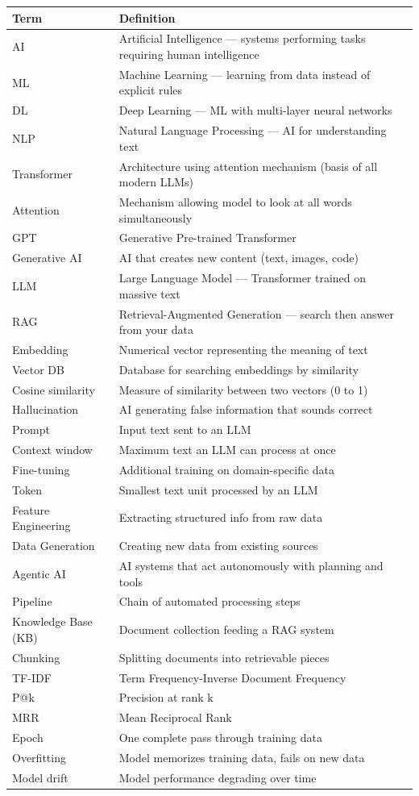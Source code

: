 \documentclass[11pt,a4paper]{report}
\begin{document}
\begin{longtable}{l p{10cm}}
\toprule
\textbf{Term} & \textbf{Definition} \\
\midrule
\endhead
AI & Artificial Intelligence --- systems performing tasks requiring human intelligence \\
ML & Machine Learning --- learning from data instead of explicit rules \\
DL & Deep Learning --- ML with multi-layer neural networks \\
NLP & Natural Language Processing --- AI for understanding text \\
Transformer & Architecture using attention mechanism (basis of all modern LLMs) \\
Attention & Mechanism allowing model to look at all words simultaneously \\
GPT & Generative Pre-trained Transformer \\
Generative AI & AI that creates new content (text, images, code) \\
LLM & Large Language Model --- Transformer trained on massive text \\
RAG & Retrieval-Augmented Generation --- search then answer from your data \\
Embedding & Numerical vector representing the meaning of text \\
Vector DB & Database for searching embeddings by similarity \\
Cosine similarity & Measure of similarity between two vectors (0 to 1) \\
Hallucination & AI generating false information that sounds correct \\
Prompt & Input text sent to an LLM \\
Context window & Maximum text an LLM can process at once \\
Fine-tuning & Additional training on domain-specific data \\
Token & Smallest text unit processed by an LLM \\
Feature Engineering & Extracting structured info from raw data \\
Data Generation & Creating new data from existing sources \\
Agentic AI & AI systems that act autonomously with planning and tools \\
Pipeline & Chain of automated processing steps \\
Knowledge Base (KB) & Document collection feeding a RAG system \\
Chunking & Splitting documents into retrievable pieces \\
TF-IDF & Term Frequency-Inverse Document Frequency \\
P@k & Precision at rank k \\
MRR & Mean Reciprocal Rank \\
Epoch & One complete pass through training data \\
Overfitting & Model memorizes training data, fails on new data \\
Model drift & Model performance degrading over time \\
\bottomrule
\end{longtable}
\end{document}

